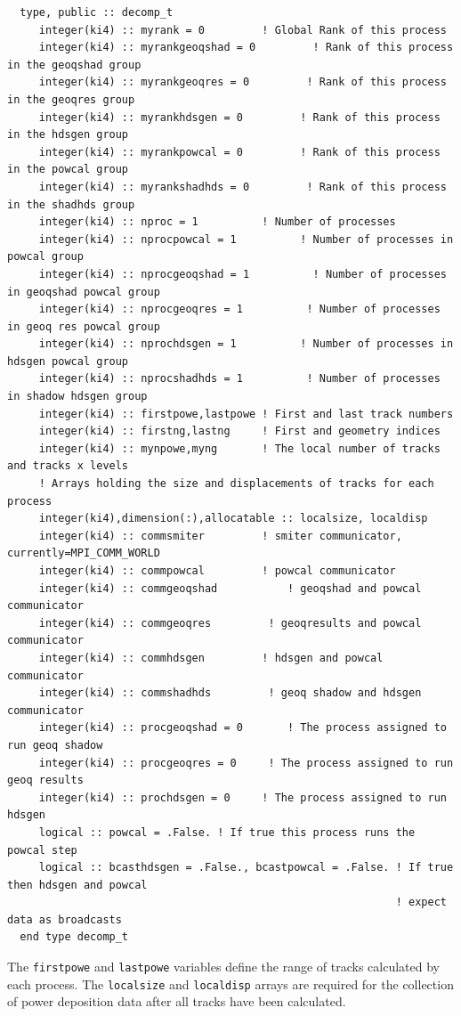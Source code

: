 \begin{lstlisting}
  type, public :: decomp_t
     integer(ki4) :: myrank = 0         ! Global Rank of this process
     integer(ki4) :: myrankgeoqshad = 0         ! Rank of this process in the geoqshad group
     integer(ki4) :: myrankgeoqres = 0         ! Rank of this process in the geoqres group
     integer(ki4) :: myrankhdsgen = 0         ! Rank of this process in the hdsgen group
     integer(ki4) :: myrankpowcal = 0         ! Rank of this process in the powcal group
     integer(ki4) :: myrankshadhds = 0         ! Rank of this process in the shadhds group
     integer(ki4) :: nproc = 1          ! Number of processes 
     integer(ki4) :: nprocpowcal = 1          ! Number of processes in powcal group
     integer(ki4) :: nprocgeoqshad = 1          ! Number of processes in geoqshad powcal group
     integer(ki4) :: nprocgeoqres = 1          ! Number of processes in geoq res powcal group
     integer(ki4) :: nprochdsgen = 1          ! Number of processes in hdsgen powcal group
     integer(ki4) :: nprocshadhds = 1          ! Number of processes in shadow hdsgen group
     integer(ki4) :: firstpowe,lastpowe ! First and last track numbers
     integer(ki4) :: firstng,lastng     ! First and geometry indices
     integer(ki4) :: mynpowe,myng       ! The local number of tracks and tracks x levels
     ! Arrays holding the size and displacements of tracks for each process
     integer(ki4),dimension(:),allocatable :: localsize, localdisp
     integer(ki4) :: commsmiter         ! smiter communicator, currently=MPI_COMM_WORLD
     integer(ki4) :: commpowcal         ! powcal communicator
     integer(ki4) :: commgeoqshad           ! geoqshad and powcal communicator
     integer(ki4) :: commgeoqres         ! geoqresults and powcal communicator
     integer(ki4) :: commhdsgen         ! hdsgen and powcal communicator
     integer(ki4) :: commshadhds         ! geoq shadow and hdsgen communicator
     integer(ki4) :: procgeoqshad = 0       ! The process assigned to run geoq shadow
     integer(ki4) :: procgeoqres = 0     ! The process assigned to run geoq results
     integer(ki4) :: prochdsgen = 0     ! The process assigned to run hdsgen
     logical :: powcal = .False. ! If true this process runs the powcal step
     logical :: bcasthdsgen = .False., bcastpowcal = .False. ! If true then hdsgen and powcal
                                                             ! expect data as broadcasts
  end type decomp_t
\end{lstlisting}

The {\tt firstpowe} and {\tt lastpowe} variables define the range of tracks calculated by each process. The {\tt localsize} and {\tt localdisp} arrays are required for the collection of power deposition data after all tracks have been calculated.

